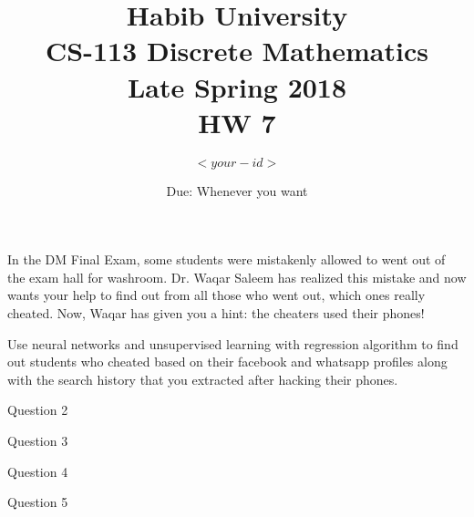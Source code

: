 \documentclass[addpoints]{exam}
\title{Habib University\\CS-113 Discrete Mathematics\\Late Spring 2018\\HW 7}
\author{$<your-id>$}  %
\date{Due: Whenever you want}
\begin{document}
\maketitle

\begin{questions}



\question
In the DM Final Exam, some students were mistakenly allowed to went out of the exam hall for washroom. Dr. Waqar Saleem has realized this mistake and now wants your help to find out from all those who went out, which ones really cheated. Now, Waqar has given you a hint: the cheaters used their phones! 

Use neural networks and unsupervised learning with regression algorithm to find out students who cheated based on their facebook and whatsapp profiles along with the search history that you extracted after hacking their phones.
  \begin{solution}
    
  \end{solution}

\question 
Question 2


  \begin{solution}
	
  \end{solution}
  
\question 
Question 3

  \begin{solution}
  
  \end{solution}

\question
Question 4

  \begin{solution}
			
  \end{solution}

\question 
Question 5

	\begin{solution}
	\end{solution}


\end{questions}
\end{document}
